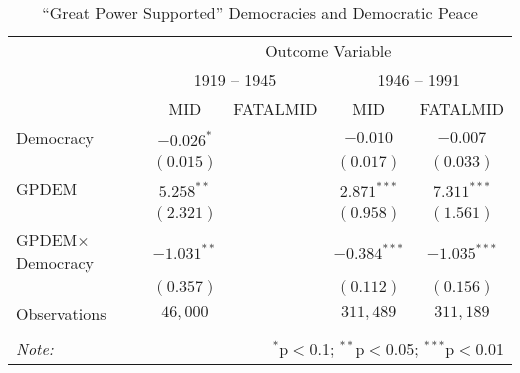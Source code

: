 
\begin{table}[!htbp] \centering 
	\caption{``Great Power Supported'' Democracies and Democratic Peace\footnotemark} 
	\label{gpdem} 
	\scriptsize
	\begin{tabular}{lcccc} 
		\toprule
		& \multicolumn{4}{c}{Outcome Variable} \\ 
		\cmidrule{2-5}
		& \multicolumn{2}{c}{1919 -- 1945} &
		  \multicolumn{2}{c}{1946 -- 1991} \\
		& MID & FATALMID & MID & FATALMID \\ 
		\midrule
		Democracy & $-0.026^{*}$ & & $-0.010$       & $-0.007$      \\
		          & $(0.015)$    & & $(0.017)$      & $(0.033)$     \\
		GPDEM     & $5.258^{**}$ & & $2.871^{***}$  & $7.311^{***}$ \\
		          & $(2.321)$    & & $(0.958)$      & $(1.561)$     \\
		GPDEM$\times$Democracy
		          & $-1.031^{**}$& & $-0.384^{***}$ & $-1.035^{***}$\\
		          & $(0.357)$    & & $(0.112)$      & $(0.156)$     \\
		\midrule
		Observations
		          & $46,000$     & & $311,489$      & $311,189$     \\
		 
		\bottomrule \\[-1.8ex] 
		\textit{Note:}  & \multicolumn{4}{r}{$^{*}$p$<$0.1; $^{**}$p$<$0.05; $^{***}$p$<$0.01}
	\end{tabular} 
\end{table} 
